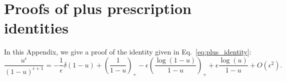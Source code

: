 \documentclass[withindex,glossary]{cam-thesis}
\begin{document}
%

\renewcommand{\bibname}{References}
\cleardoublepage
{}
{}






\appendix

\chapter{Proofs of plus prescription identities}
\label{app:plus_prescription}
In this Appendix, we give a proof of the identity given in Eq.~\eqref{eq:plus_identity}:
\begin{equation}
\label{eq:plus_identity_2}
\frac{u^{\epsilon}}{(1-u)^{\epsilon+1}} = -\frac{1}{\epsilon} \delta(1-u) + \left( \frac{1}{1-u} \right)_+ - \epsilon \left( \frac{\log(1-u)}{1-u} \right)_+ + \epsilon \frac{\log(u)}{1-u} + O(\epsilon^2).
\end{equation}



\printthesisindex
\end{document}
